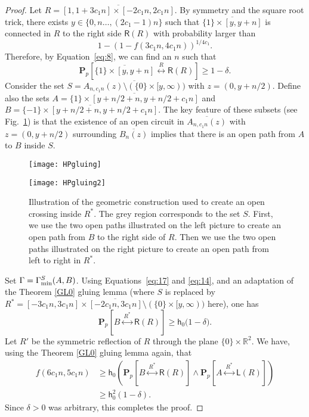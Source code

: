 \documentclass[12pt, twoside,a4paper,reqno]{amsart}
\theoremstyle{plain}
\theoremstyle{remark}
\theoremstyle{definition}
\newcommand{\R}{\mathbb{R}}
\newcommand{\PP}{\mathbf{P}}
\newcommand{\Pp}[1]{\PP_p \left [ #1 \right ]}
\newcommand{\lr}[1][]{\overset{\:#1\:}\longleftrightarrow}
\newcommand{\ol}{\overline}
\begin{document}
\begin{proof}
Let $R=\ol{[1,1+3c_1n]\times[-2c_1n,2c_1n]}$. By symmetry and the square root trick, there
exists $y\in \{0,n\ldots,(2c_1-1)n\}$ such that $\overline{\{1\}\times[y,y+n]}$ is
connected in $R$ to the right side $\mathsf R(R)$ with probability larger than
\begin{equation}
  \label{eq:20}
  1- (1-f(3c_1n,4c_1n))^{1/4c_1}.
\end{equation}
Therefore, by Equation~\eqref{eq:8}, we can find an $n$ such that
\begin{equation}
 \Pp{\overline{\{1\}\times[y,y+n]} \lr[R]\mathsf R(R)}\ge 1-\delta. \label{eq:14}
\end{equation}
Consider the set $S= \overline{A_{n,c_1n}(z)\setminus (\{0\}\times[y,\infty))}$
with $z=(0,y+n/2)$. Define also the sets $A=\ol{\{1\} \times [y+n/2+n, y+n/2+c_1n]}$ and $B=
\ol{\{-1\} \times [y+n/2+n, y+n/2+c_1n]}$. The key feature of these subsets (see
Fig.~\ref{fig:6}) is that the existence of an open circuit in
$\ol{A_{n,c_1n}(z)}$ with $z=(0,y+n/2)$ surrounding $\ol{B_n(z)}$ implies that
there is an open path from $A$ to $B$ inside $S$.
\begin{figure}[htbp]
  \centering
  \hfill
  \begin{minipage}{.49\linewidth}
    \texttt{[image: HPgluing]}
  \end{minipage}
  \hfill
   \begin{minipage}{.49\linewidth}
    \texttt{[image: HPgluing2]}
  \end{minipage}

  \caption{Illustration of the geometric construction used to create an open
    crossing inside $R^*$. The grey region corresponds to the set $S$. First, we
    use the two open paths illustrated on the left picture to create an open
    path from $B$ to the right side of $R$. Then we use the two open paths
    illustrated on the right picture to create an open path from left to right
    in $R^*$. }
  \label{fig:6}
\end{figure}

\noindent Set $\Gamma=\Gamma_{\rm min}^S(A,B)$. Using Equations~\eqref{eq:17}
and \eqref{eq:14}, and an adaptation of the Theorem \ref{GL0} gluing lemma (where
$S$ is replaced  by $R^* = \ol{[-3c_1n,3c_1n]\times
[-2c_1n,3 c_1n] \setminus (\{0\}\times[y,\infty))}$ here), one has
\begin{equation}
  \label{eq:21}
  \Pp{B\lr[R^{*}] \mathsf R(R)}\ge \mathsf h_0\big(1-\delta\big).
\end{equation}
Let $R'$ be the symmetric reflection of $R$ through the plane $\{0\}\times \R^2$.
We have, using the Theorem \ref{GL0} gluing lemma again, that
\begin{align}
  \label{eq:22}
  f(6c_1n,5c_1n)&\ge \mathsf h_0(\Pp{B\lr[R^{*}] \mathsf R(R)} \wedge \Pp{A\lr[R^{*}] \mathsf L(R)})\\
  &\ge \mathsf h_0^{2}(1-\delta ).
\end{align}
Since $\delta>0$ was arbitrary, this completes the proof.



\end{proof}
\end{document}

